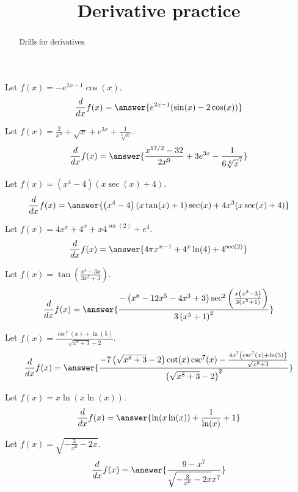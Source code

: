 \documentclass{ximera}
\title[Reinforce:]{Derivative practice}
\begin{document}
\begin{abstract}
  Drills for derivatives.
\end{abstract}
\maketitle


\begin{shuffle}


\begin{exercise}
Let $f(x)=-e^{2 x-1} \cos (x)$.
\[
\ddx f(x) = \answer{e^{2 x-1} (\sin (x)-2 \cos (x))}
\]
\end{exercise}

\begin{exercise}
Let $f(x)=\frac{2}{x^8}+\sqrt{x}+e^{3 x}+\frac{1}{\sqrt[6]{x}}$.
\[
\ddx f(x) = \answer{\frac{x^{17/2}-32}{2 x^9}+3 e^{3 x}-\frac{1}{6 \sqrt[6]{x}^7}}
\]
\end{exercise}

\begin{exercise}
Let $f(x)=\left(x^4-4\right) (x \sec (x)+4)$.
\[
\ddx f(x) = \answer{\left(x^4-4\right) (x \tan (x)+1) \sec (x)+4 x^3 (x \sec (x)+4)}
\]
\end{exercise}

\begin{exercise}
Let $f(x)=4 x^{\pi }+4^x+x 4^{\sec (2)}+e^4$.
\[
\ddx f(x) = \answer{4 \pi  x^{\pi -1}+4^x \ln (4)+4^{\sec (2)}}
\]
\end{exercise}

\begin{exercise}
Let $f(x)=\tan \left(\frac{x^4-3 x}{3 x^5+3}\right)$.
\[
\ddx f(x) = \answer{\frac{-\left(x^8-12 x^5-4 x^3+3\right) \sec ^2\left(\frac{x \left(x^3-3\right)}{3 \left(x^5+1\right)}\right)}{3 \left(x^5+1\right)^2}}
\]
\end{exercise}

\begin{exercise}
Let $f(x)=\frac{\csc ^7(x)+\ln (5)}{\sqrt{x^8+3}-2}$.
\[
\ddx f(x) = \answer{\frac{-7 \left(\sqrt{x^8+3}-2\right) \cot (x) \csc ^7(x)-\frac{4 x^7 \left(\csc ^7(x)+\ln (5)\right)}{\sqrt{x^8+3}}}{\left(\sqrt{x^8+3}-2\right)^2}}
\]
\end{exercise}

\begin{exercise}
Let $f(x)=x \ln (x \ln (x))$.
\[
\ddx f(x) = \answer{\ln (x \ln (x))+\frac{1}{\ln (x)}+1}
\]
\end{exercise}

\begin{exercise}
Let $f(x)=\sqrt{-\frac{3}{x^6}-2 x}$.
\[
\ddx f(x) = \answer{\frac{9-x^7}{\sqrt{-\frac{3}{x^6}-2 x} x^7}}
\]
\end{exercise}


\end{shuffle}
\end{document}
